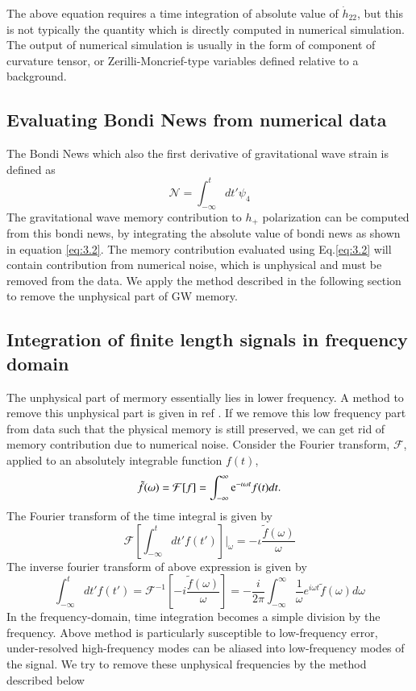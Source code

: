 \documentclass[prd,preprintnumbers,twocolumn,eqsecnum,floatfix,letter]{revtex4}
\begin{document}
The above equation requires a time integration of absolute value of $\dot{h}_{22}$, but this is not typically the quantity which is directly computed in numerical simulation. The output of numerical simulation is usually in the form of component of curvature tensor, or Zerilli-Moncrief-type variables defined relative to a background. 
\subsection{Evaluating Bondi News from numerical data}
The Bondi News which also the first derivative of gravitational wave strain is defined as
\begin{equation}\label{3.3}
\mathcal{N} = \int_{-\infty}^{t}dt' \psi_4
\end{equation}
The gravitational wave memory contribution to $h_{+}$ polarization can be computed from this bondi news, by integrating the absolute value of bondi news as shown in equation \ref{eq:3.2}. The memory contribution evaluated using Eq.\ref{eq:3.2} will contain contribution from numerical noise, which is unphysical and must be removed from the data. We apply the method described in the following section to remove the unphysical part of GW memory. 
\subsection{Integration of finite length signals in frequency domain}
The unphysical part of mermory essentially lies in lower frequency. A method to remove this unphysical part is given in ref \cite{Reisswig_Pollney2011}. If we remove this low frequency part from data such that the physical memory is still preserved, we can get rid of memory contribution due to numerical noise. 
Consider the Fourier transform, $\mathcal{F}$, applied to an absolutely integrable function $f(t)$,
\begin{equation}
	\tilde{f}(\omega) = \mathcal{F}[f]=\int_{-\infty}^{\infty}\mathrm{e}^{-\iota \omega t}f(t)dt.	
\end{equation} 
The Fourier transform of the time integral is given by
\begin{equation}
	\mathcal{F}\left[\int_{-\infty}^{t}dt' f(t')\right] |_\omega = -\iota \frac{\tilde{f}(\omega)}{\omega}
\end{equation}
The inverse fourier transform of above expression is given by
\begin{equation}\label{3.6}
	\int_{-\infty}^{t}dt'f(t')=\mathcal{F}^{-1}\left[-\mathit{i}\frac{\tilde{f}(\omega)}{\omega}\right] = -\frac{\mathit{i}}{2\pi}\int_{-\infty}^{\infty}\frac{1}{\omega}e^{\mathit{i\omega t}}\tilde{f}(\omega)d\omega
\end{equation}
In the frequency-domain, time integration becomes a simple division by the frequency. Above method is particularly susceptible to low-frequency error, under-resolved high-frequency modes can be aliased into low-frequency modes of the signal. We try to remove these unphysical frequencies by the method described below   
\end{document}
